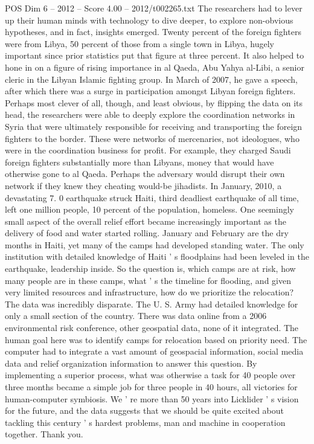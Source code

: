 \begin{textsample}{POS Dim 6 – 2012 – Score 4.00 – 2012/t002265.txt}
The researchers had to lever up their human minds with technology to dive deeper, to explore non-obvious hypotheses, and in fact, insights emerged.
Twenty percent of the foreign fighters were from Libya, 50 percent of those from a single town in Libya, hugely important since prior statistics put that figure at three percent.
It also helped to hone in on a figure of rising importance in al Qaeda, Abu Yahya al-Libi, a senior cleric in the Libyan Islamic fighting group.
In March of 2007, he gave a speech, after which there was a surge in participation amongst Libyan foreign fighters.
Perhaps most clever of all, though, and least obvious, by flipping the data on its head, the researchers were able to deeply explore the coordination networks in Syria that were ultimately responsible for receiving and transporting the foreign fighters to the border.
These were networks of mercenaries, not ideologues, who were in the coordination business for profit.
For example, they charged Saudi foreign fighters substantially more than Libyans, money that would have otherwise gone to al Qaeda.
Perhaps the adversary would disrupt their own network if they knew they cheating would-be jihadists.
In January, 2010, a devastating 7. 0 earthquake struck Haiti, third deadliest earthquake of all time, left one million people, 10 percent of the population, homeless.
One seemingly small aspect of the overall relief effort became increasingly important as the delivery of food and water started rolling.
January and February are the dry months in Haiti, yet many of the camps had developed standing water.
The only institution with detailed knowledge of Haiti ' s floodplains had been leveled in the earthquake, leadership inside.
So the question is, which camps are at risk, how many people are in these camps, what ' s the timeline for flooding, and given very limited resources and infrastructure, how do we prioritize the relocation?
The data was incredibly disparate.
The U.
S.
Army had detailed knowledge for only a small section of the country.
There was data online from a 2006 environmental risk conference, other geospatial data, none of it integrated.
The human goal here was to identify camps for relocation based on priority need.
The computer had to integrate a vast amount of geospacial information, social media data and relief organization information to answer this question.
By implementing a superior process, what was otherwise a task for 40 people over three months became a simple job for three people in 40 hours, all victories for human-computer symbiosis.
We ' re more than 50 years into Licklider ' s vision for the future, and the data suggests that we should be quite excited about tackling this century ' s hardest problems, man and machine in cooperation together.
Thank you.

\end{textsample}
